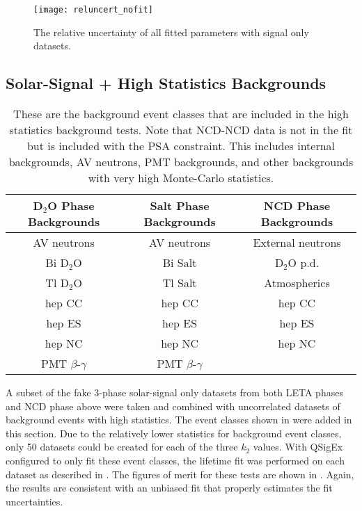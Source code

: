 \begin{figure}
\centering
\texttt{[image: reluncert\_nofit]}
\caption{
The relative uncertainty of all fitted parameters with signal only datasets.
}
\label{fig:sigonly_reluncert}
\end{figure}

\subsection{Solar-Signal + High Statistics Backgrounds}

\begin{table}
\centering
\begin{tabular}{ccc}
\hline
D$_2$O Phase Backgrounds & Salt Phase Backgrounds & NCD Phase Backgrounds \\ \hline \hline
AV neutrons & AV neutrons & External neutrons \\
Bi D$_2$O & Bi Salt & D$_2$O p.d. \\ 
Tl D$_2$O & Tl Salt & Atmospherics \\
hep CC & hep CC & hep CC \\
hep ES & hep ES & hep ES \\
hep NC & hep NC & hep NC \\
PMT $\beta$-$\gamma$ & PMT $\beta$-$\gamma$ \\ \hline
\end{tabular}
\caption{
These are the background event classes that are included in the high statistics background tests. Note that NCD-NCD data is not in the fit but is included with the PSA constraint. This includes internal backgrounds, AV neutrons, PMT backgrounds, and other backgrounds with very high Monte-Carlo statistics.
}
\label{tbl:noextbitl_event_classes}
\end{table}

A subset of the fake 3-phase solar-signal only datasets from both LETA phases and NCD phase above were taken and combined with uncorrelated datasets of background events with high statistics.
The event classes shown in  were added in this section. 
Due to the relatively lower statistics for background event classes, only 50 datasets could be created for each of the three $k_2$ values.
With QSigEx configured to only fit these event classes, the lifetime fit was performed on each dataset as described in . 
The figures of merit for these tests are shown in . 
Again, the results are consistent with an unbiased fit that properly estimates the fit uncertainties.

